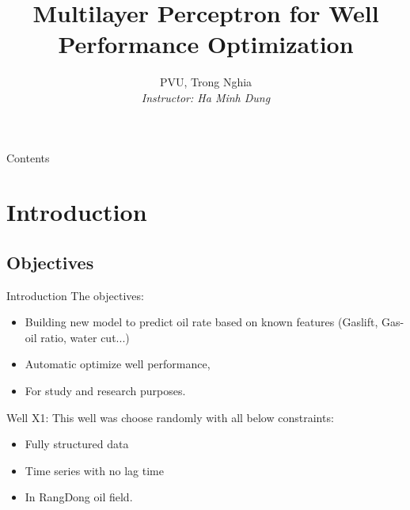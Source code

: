 \documentclass[xcolor=table, 11pt]{beamer}
\author{PVU, Trong Nghia\\
\textit{Instructor: Ha Minh Dung}}
\title{Multilayer Perceptron for Well Performance Optimization}
\institute{Japan Vietnam Petroleum Company}
\begin{document}
 
\begin{frame}
\titlepage %
\end{frame}
 
\begin{frame}{Contents}
\tableofcontents %
\end{frame}

\section{Introduction}
\subsection{Objectives}
\begin{frame}{Introduction}
The objectives:
    \begin{itemize}
        \item Building new model to predict oil rate based on known features (Gaslift, Gas-oil ratio, water cut...)
        \item Automatic optimize well performance,
        \item For study and research purposes.
    \end{itemize}
Well X1: This well was choose randomly with all below constraints:
    \begin{itemize}
        \item Fully structured data
        \item Time series with no lag time
        \item In RangDong oil field.
    \end{itemize}
\end{frame}
\end{document}
